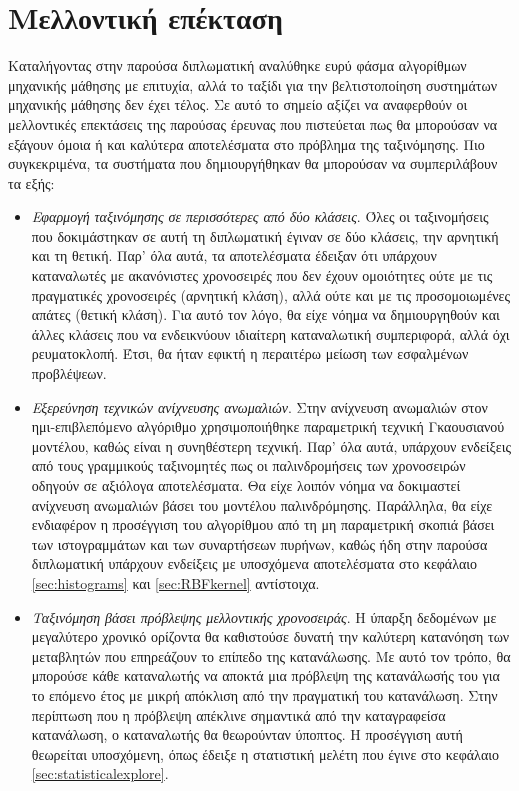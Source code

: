 \section{Μελλοντική επέκταση}
Καταλήγοντας στην παρούσα διπλωματική αναλύθηκε ευρύ φάσμα αλγορίθμων μηχανικής μάθησης με επιτυχία, αλλά το ταξίδι για την βελτιστοποίηση συστημάτων μηχανικής μάθησης δεν έχει τέλος. Σε αυτό το σημείο αξίζει να αναφερθούν οι μελλοντικές επεκτάσεις της παρούσας έρευνας που πιστεύεται πως θα μπορούσαν να εξάγουν όμοια ή και καλύτερα αποτελέσματα στο πρόβλημα της ταξινόμησης. Πιο συγκεκριμένα, τα συστήματα που δημιουργήθηκαν θα μπορούσαν να συμπεριλάβουν τα εξής:
\begin{itemize}
\item \textit{Εφαρμογή ταξινόμησης σε περισσότερες από δύο κλάσεις}. Όλες οι ταξινομήσεις που δοκιμάστηκαν σε αυτή τη διπλωματική έγιναν σε δύο κλάσεις, την αρνητική και τη θετική. Παρ' όλα αυτά, τα αποτελέσματα έδειξαν ότι υπάρχουν καταναλωτές με ακανόνιστες χρονοσειρές που δεν έχουν ομοιότητες ούτε με τις πραγματικές χρονοσειρές (αρνητική κλάση), αλλά ούτε και με τις προσομοιωμένες απάτες (θετική κλάση). Για αυτό τον λόγο, θα είχε νόημα να δημιουργηθούν και άλλες κλάσεις που να ενδεικνύουν ιδιαίτερη καταναλωτική συμπεριφορά, αλλά όχι ρευματοκλοπή. Έτσι, θα ήταν εφικτή η περαιτέρω μείωση των εσφαλμένων προβλέψεων.
\item \textit{Εξερεύνηση τεχνικών ανίχνευσης ανωμαλιών}. Στην ανίχνευση ανωμαλιών στον ημι-επιβλεπόμενο αλγόριθμο χρησιμοποιήθηκε παραμετρική τεχνική Γκαουσιανού μοντέλου, καθώς είναι η συνηθέστερη τεχνική. Παρ' όλα αυτά, υπάρχουν ενδείξεις από τους γραμμικούς ταξινομητές πως οι παλινδρομήσεις των χρονοσειρών οδηγούν σε αξιόλογα αποτελέσματα. Θα είχε λοιπόν νόημα να δοκιμαστεί ανίχνευση ανωμαλιών βάσει του μοντέλου παλινδρόμησης. Παράλληλα, θα είχε ενδιαφέρον η προσέγγιση του αλγορίθμου από τη μη παραμετρική σκοπιά βάσει των ιστογραμμάτων και των συναρτήσεων πυρήνων, καθώς ήδη στην παρούσα διπλωματική υπάρχουν ενδείξεις με υποσχόμενα αποτελέσματα στο κεφάλαιο \ref{sec:histograms} και \ref{sec:RBFkernel} αντίστοιχα.
\item \textit{Ταξινόμηση βάσει πρόβλεψης μελλοντικής χρονοσειράς}. H ύπαρξη δεδομένων με μεγαλύτερο χρονικό ορίζοντα θα καθιστούσε δυνατή την καλύτερη κατανόηση των μεταβλητών που επηρεάζουν το επίπεδο της κατανάλωσης. Με αυτό τον τρόπο, θα μπορούσε κάθε καταναλωτής να αποκτά μια πρόβλεψη της κατανάλωσής του για το επόμενο έτος με μικρή απόκλιση από την πραγματική του κατανάλωση. Στην περίπτωση που η πρόβλεψη απέκλινε σημαντικά από την καταγραφείσα κατανάλωση, ο καταναλωτής θα θεωρούνταν ύποπτος. Η προσέγγιση αυτή θεωρείται υποσχόμενη, όπως έδειξε η στατιστική μελέτη που έγινε στο κεφάλαιο \ref{sec:statisticalexplore}.
\end{itemize} 